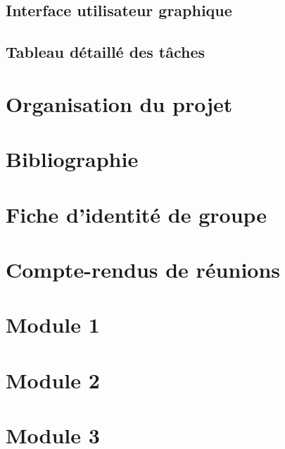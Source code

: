 \documentclass[a4paper,10pt]{report}
\theoremstyle{remark}
\begin{document}
	\section{Interface utilisateur graphique}
		
		
	\section{Tableau détaillé des tâches}
		

\chapter{Organisation du projet}

	


\chapter{Bibliographie}

	



\appendix

\chapter{Fiche d'identité de groupe}
	

\chapter{Compte-rendus de réunions}
	

\chapter{Module 1}
	

\chapter{Module 2}
	

\chapter{Module 3}
	
\end{document}
